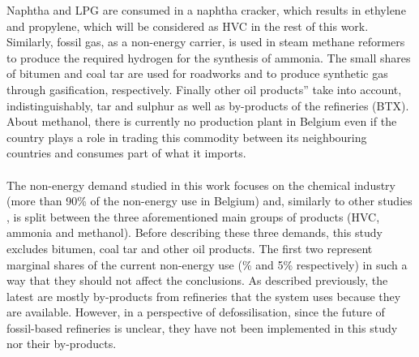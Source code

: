 Naphtha and \gls{LPG} are consumed in a naphtha cracker, which results in ethylene and propylene, which will be considered as \gls{HVC} in the rest of this work. Similarly, fossil gas, as a non-energy carrier, is used in steam methane reformers to produce the required hydrogen for the synthesis of ammonia. The small shares of bitumen and coal tar are used for roadworks and to produce synthetic gas through gasification, respectively. Finally \og other oil products'' take into account, indistinguishably, tar and sulphur as well as by-products of the refineries (\eg \gls{BTX}). About methanol, there is currently no production plant in Belgium even if the country plays a role in trading this commodity between its neighbouring countries and consumes part of what it imports.\\

\\

\noindent
The non-energy demand studied in this work focuses on the chemical industry (more than 90\% of the non-energy use in Belgium) and, similarly to other studies \cite{IEA2018_petrochemicals, daioglou2014energy}, is split between the three aforementioned main groups of products (\ie \gls{HVC}, ammonia and methanol). Before describing these three demands, this study excludes bitumen, coal tar and \og other oil products\fg. The first two represent marginal shares of the current non-energy use (\% and 5\% respectively) in such a way that they should not affect the conclusions. As described previously, the latest are mostly by-products from refineries that the system uses because they are available. However, in a perspective of defossilisation, since the future of fossil-based refineries is unclear, they have not been implemented in this study nor their by-products.

